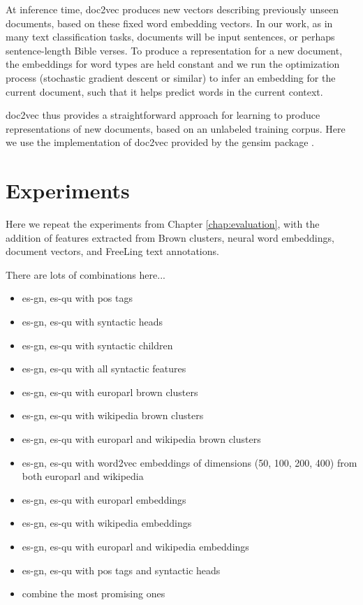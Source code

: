 At inference time, doc2vec produces new vectors describing previously unseen
documents, based on these fixed word embedding vectors. In our work, as in many
text classification tasks, documents will be input sentences, or perhaps
sentence-length Bible verses. To produce a representation for a new document,
the embeddings for word types are held constant and we run the optimization
process (stochastic gradient descent or similar) to infer an embedding for the
current document, such that it helps predict words in the current context.

doc2vec thus provides a straightforward approach for learning to produce
representations of new documents, based on an unlabeled training corpus. Here
we use the implementation of doc2vec provided by the gensim package
\cite{rehurek-lrec}.

\section{Experiments}
Here we repeat the experiments from Chapter \ref{chap:evaluation}, with the
addition of features extracted from Brown clusters, neural word embeddings,
document vectors, and FreeLing text annotations.

There are lots of combinations here...

\begin{itemize}
  \item es-gn, es-qu with pos tags
  \item es-gn, es-qu with syntactic heads
  \item es-gn, es-qu with syntactic children
  \item es-gn, es-qu with all syntactic features
\end{itemize}

\begin{itemize}
  \item es-gn, es-qu with europarl brown clusters
  \item es-gn, es-qu with wikipedia brown clusters
  \item es-gn, es-qu with europarl and wikipedia brown clusters
  \item es-gn, es-qu with word2vec embeddings of dimensions (50, 100, 200, 400)
  from both europarl and wikipedia
\end{itemize}

\begin{itemize}
  \item es-gn, es-qu with europarl embeddings
  \item es-gn, es-qu with wikipedia embeddings
  \item es-gn, es-qu with europarl and wikipedia embeddings
  \item es-gn, es-qu with pos tags and syntactic heads
\end{itemize}

\begin{itemize}
  \item combine the most promising ones
\end{itemize}
